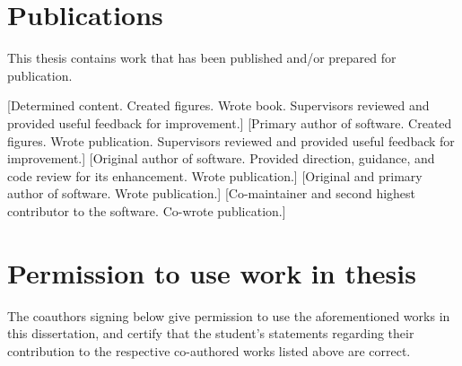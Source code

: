 \documentclass{book}
\begin{document}
\section*{Publications}

This thesis contains work that has been published and/or prepared for publication.






[Determined content. Created figures. Wrote book. Supervisors reviewed and provided useful feedback for improvement.]
[Primary author of software. Created figures. Wrote publication. Supervisors reviewed and provided useful feedback for improvement.]
[Original author of software. Provided direction, guidance, and code review for its enhancement. Wrote publication.]
[Original and primary author of software. Wrote publication.]
[Co-maintainer and second highest contributor to the software. Co-wrote publication.]

\newpage

\section*{Permission to use work in thesis}
The coauthors signing below give permission to use the aforementioned works
in this dissertation,
and certify that the student's statements regarding their contribution to the respective co-authored works listed above are correct.
\end{document}
